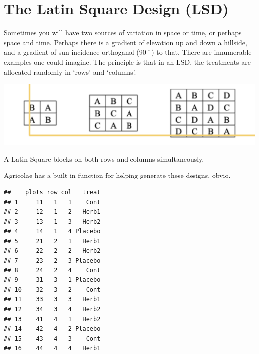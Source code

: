 \documentclass[
]{book}
\newenvironment{Shaded}{\begin{snugshade}}{\end{snugshade}}
\newcommand{\AttributeTok}[1]{\textcolor[rgb]{0.77,0.63,0.00}{#1}}
\newcommand{\CommentTok}[1]{\textcolor[rgb]{0.56,0.35,0.01}{\textit{#1}}}
\newcommand{\DecValTok}[1]{\textcolor[rgb]{0.00,0.00,0.81}{#1}}
\newcommand{\FunctionTok}[1]{\textcolor[rgb]{0.00,0.00,0.00}{#1}}
\newcommand{\NormalTok}[1]{#1}
\newcommand{\OtherTok}[1]{\textcolor[rgb]{0.56,0.35,0.01}{#1}}
\newcommand{\SpecialCharTok}[1]{\textcolor[rgb]{0.00,0.00,0.00}{#1}}
\newcommand{\StringTok}[1]{\textcolor[rgb]{0.31,0.60,0.02}{#1}}
\begin{document}
\hypertarget{the-latin-square-design-lsd}{%
\chapter{The Latin Square Design (LSD)}\label{the-latin-square-design-lsd}}

Sometimes you will have two sources of variation in space or time, or perhaps space and time. Perhaps there is a gradient of elevation up and down a hillside, and a gradient of sun incidence orthoganol (90˚) to that. There are innumerable examples one could imagine. The principle is that in an LSD, the treatments are allocated randomly in `rows' and `columns'.

\includegraphics[width=16.22in]{images/lsd}

A Latin Square blocks on both rows and columns simultaneously.

Agricolae has a built in function for helping generate these designs, obvio.

\begin{Shaded}
\end{Shaded}

\begin{verbatim}
##    plots row col   treat
## 1     11   1   1    Cont
## 2     12   1   2   Herb1
## 3     13   1   3   Herb2
## 4     14   1   4 Placebo
## 5     21   2   1   Herb1
## 6     22   2   2   Herb2
## 7     23   2   3 Placebo
## 8     24   2   4    Cont
## 9     31   3   1 Placebo
## 10    32   3   2    Cont
## 11    33   3   3   Herb1
## 12    34   3   4   Herb2
## 13    41   4   1   Herb2
## 14    42   4   2 Placebo
## 15    43   4   3    Cont
## 16    44   4   4   Herb1
\end{verbatim}
\end{document}

